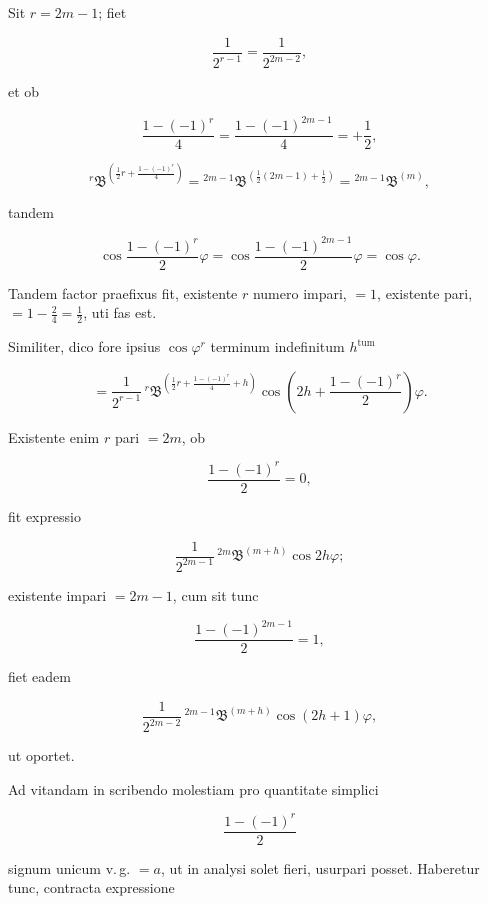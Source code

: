 Sit $r=2m-1$; fiet

\[
\frac{1}{2^{r-1}} = \frac{1}{2^{2m-2}},
\]

\noindent et ob

\[
\frac{1-(-1)^r}{4} = \frac{1-(-1)^{2m-1}}{4} = +\frac{1}{2},
\]

\[
{}^{r}\mathfrak{B}^{\left(\frac{1}{2}r+\frac{1-(-1)^r}{4}\right)} = {}^{2m-1}\mathfrak{B}^{\left(\frac{1}{2}(2m-1)+\frac{1}{2}\right)} = {}^{2m-1}\mathfrak{B}^{(m)},
\]

\noindent tandem

\[
\cos\frac{1-(-1)^r}{2}\varphi = \cos\frac{1-(-1)^{2m-1}}{2}\varphi = \cos\varphi.
\]

Tandem factor praefixus fit, existente $r$ numero impari, $=1$, existente pari,
$=1-\tfrac{2}{4}=\tfrac{1}{2}$, uti fas est.

Similiter, dico fore ipsius $\cos\varphi^r$ terminum indefinitum $h^{\text{tum}}$

\[
= \frac{1}{2^{r-1}}\,{}^{r}\mathfrak{B}^{\left(\frac{1}{2}r+\frac{1-(-1)^r}{4}+h\right)}\cos\left(2h+\frac{1-(-1)^r}{2}\right)\varphi.
\]

Existente enim $r$ pari $=2m$, ob

\[
\frac{1-(-1)^r}{2} = 0,
\]

\noindent fit expressio

\[
\frac{1}{2^{2m-1}}\,{}^{2m}\mathfrak{B}^{(m+h)}\cos2h\varphi;
\]

\noindent existente impari $=2m-1$, cum sit tunc

\[
\frac{1-(-1)^{2m-1}}{2} = 1,
\]

\noindent fiet eadem

\[
\frac{1}{2^{2m-2}}\,{}^{2m-1}\mathfrak{B}^{(m+h)}\cos(2h+1)\varphi,
\]

\noindent ut oportet.

Ad vitandam in scribendo molestiam pro quantitate simplici

\[
\frac{1-(-1)^r}{2}
\]

\noindent signum unicum v.\,g. $=a$, ut in analysi solet fieri, usurpari posset. Haberetur tunc,
contracta expressione
